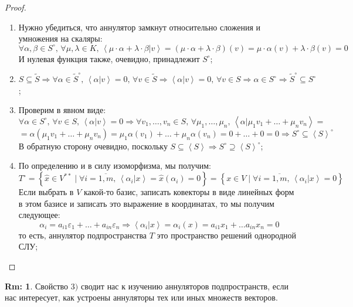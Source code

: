 \documentclass[12pt]{article}
\newcommand{\VE}{\varepsilon}
\theoremstyle{definition}
\newtheorem{rem}{Rm:}
\newcommand{\linsp}[1]{\left\langle #1 \right\rangle }
\newcommand{\linmer}[2]{\left\langle #1 \vert #2\right\rangle }
\newcommand{\wte}[1]{\widetilde{#1}}
\newcommand{\wht}[1]{\widehat{#1}}
\begin{document}
\begin{proof}\hfill
	\begin{enumerate}[label=\arabic*)]
		\item Нужно убедиться, что аннулятор замкнут относительно сложения и умножения на скаляры:
		$$
			\forall \alpha,\beta \in S^{\circ}, \, \forall \mu, \lambda \in K, \, \linmer{\mu{\cdot} \alpha + \lambda{\cdot}  \beta}{v} = (\mu{\cdot}\alpha + \lambda{\cdot} \beta)(v) = \mu{\cdot} \alpha(v) + \lambda{\cdot} \beta(v) = 0
		$$
		И нулевая функция также, очевидно, принадлежит $S^{\circ}$;
		\item $S \subseteq \wte{S} \Rightarrow \forall \alpha \in \wte{S}^{\circ}, \, \linmer{\alpha}{v} = 0, \, \forall v \in \wte{S} \Rightarrow \linmer{\alpha}{v} = 0, \, \forall v \in S \Rightarrow \alpha \in S^{\circ} \Rightarrow \wte{S}^{\circ} \subseteq S^{\circ}$; 
		
		\item Проверим в явном виде:
		$$
			\forall \alpha \in S^{\circ}, \, \forall v \in S, \, \linmer{\alpha}{v} = 0 \Rightarrow \forall v_1, \dotsc, v_n \in S, \, \forall \mu_1,\dotsc,\mu_n, \, \linmer{\alpha}{\mu_1 v_1 + \dotsc + \mu_n v_n} = 
		$$
		$$
			= \alpha(\mu_1 v_1 + \dotsc + \mu_n v_n) = \mu_1 \alpha(v_1) + \dotsc + \mu_n\alpha(v_n) = 0 + \dotsc + 0 = 0 \Rightarrow S^{\circ} \subseteq \linsp{S}^{\circ}
		$$
		В обратную сторону очевидно, поскольку $S \subseteq \linsp{S} \Rightarrow S^{\circ} \supseteq \linsp{S}^{\circ}$;
		
		\item По определению и в силу изоморфизма, мы получим:
		$$
			T^{\circ} = \left\{ \wht{x} \in V^{**} \mid \forall i = \overline{1,m}, \, \linmer{\alpha_i}{x} = \wht{x}(\alpha_i) = 0 \right\} = \left\{x \in V \mid \forall i =\overline{1,m}, \, \linmer{\alpha_i}{x} = 0\right\}
		$$
		Если выбрать в $V$ какой-то базис, записать ковекторы в виде линейных форм в этом базисе и записать это выражение в координатах, то мы получим следующее:
		$$
			\alpha_i = a_{i1}\VE_1 + \dotsc + a_{in}\VE_n \Rightarrow \linmer{\alpha_i}{x} = \alpha_i(x) = a_{i1} x_1 + \dotsc a_{in} x_n = 0
		$$
		то есть, аннулятор подпространства $T$ это пространство решений однородной СЛУ;
	\end{enumerate}
\end{proof}
\begin{rem}
	Свойство $3)$ сводит нас к изучению аннуляторов подпространств, если нас интересует, как устроены аннуляторы тех или иных множеств векторов.
\end{rem}
\end{document}

